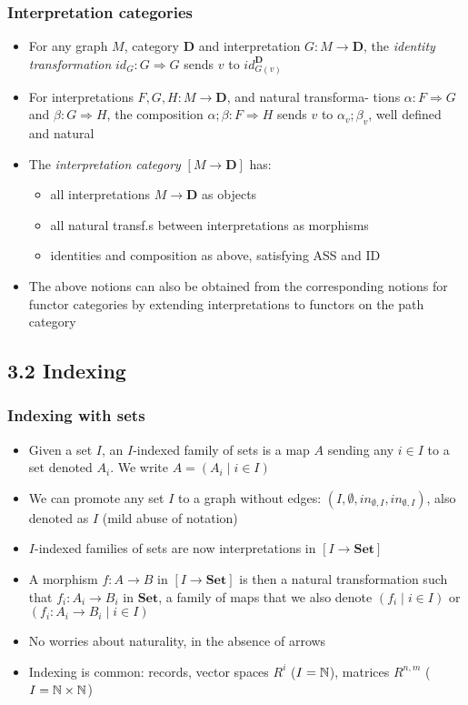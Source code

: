 \documentclass[handout]{beamer}
\newcommand{\To}{\Rightarrow}
\newcommand{\bfsf}[1]{{\boldsymbol{#1}}}
\newcommand{\Set}{\bfsf{Set}}
\newcommand{\DD}{\bfsf{D}}
\begin{document}
\frame
  {   
    \frametitle{Interpretation categories}\label{Ch3:interpretationcats}

 \begin{itemize}[<+->]
\item For any graph $M$,  category $\DD$ and interpretation $G: M\to\DD$, the 
\emph{identity transformation} $id_G : G\To G$ sends $v$ to $id^\DD_{G(v)}$
\item For interpretations $F,G,H: M\to\DD$, and natural
transforma- tions $\alpha: F\To G$ and $\beta:G\To H$, the composition
$\alpha;\beta: F\To H$ sends $v$ to $\alpha_v;\beta_v$, well defined and natural
 \item The \emph{interpretation category} $[M\to\DD]$ has:
   \begin{itemize}[<+->]
\item all interpretations $M\to\DD$ as objects 
\item all natural transf.s  between interpretations as morphisms 
\item identities and composition as above, satisfying ASS and ID
   \end{itemize}
\item The above notions can also be obtained from the corresponding
notions for functor categories by extending interpretations
to functors on the path category
 \end{itemize}

 }

\subsection{3.2 Indexing}

\frame
  {   
    \frametitle{Indexing with sets}\label{Ch3:indexset}

 \begin{itemize}[<+->]
\item Given a set $I$, an $I$-indexed family of sets is a map $A$
sending any $i\in I$ to a set denoted $A_i$. We write $A=(A_i \mid i\in I)$
\item We can promote any set $I$ to a graph without edges: 
$(I,\emptyset,in_{\emptyset,I},in_{\emptyset,I})$, also denoted as $I$ (mild abuse of notation)
 \item $I$-indexed families of sets are now interpretations in $[I\to \Set]$
 \item A morphism $f: A\to B$ in $[I\to \Set]$ is then a natural transformation
such that $f_i: A_i \to B_i$ in $\Set$, a family of maps that we also denote
$(f_i \mid i\in I)$ or $(f_i: A_i\to B_i \mid i\in I)$
\item No worries about naturality, in the absence of arrows
\item Indexing is common: records, 
vector spaces $R^i$ ($I=\mathbb{N}$), matrices $R^{n,m}$ ($I={\mathbb{N}\times\mathbb{N}}$)
 \end{itemize}

 }
\end{document}
